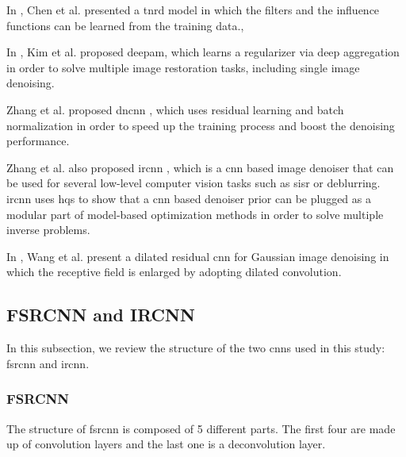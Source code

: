 In \cite{TNRD}, Chen et al. presented a  \gls{tnrd} model in which the filters and the influence functions can be learned from the training data., 

In \cite{DEEPAM}, Kim et al. proposed \gls{deepam}, which learns a regularizer via deep aggregation in order to solve multiple image restoration tasks, including single image denoising.  

Zhang et al. proposed \gls{dncnn} \cite{DNCNN}, which uses residual learning and batch normalization in order to speed up the training process and boost the denoising performance.

Zhang et al. also proposed \gls{ircnn} \cite{IRCNN}, which is a \gls{cnn} based image denoiser that can be used for several low-level computer vision tasks such as \gls{sisr} or deblurring. \gls{ircnn} uses \gls{hqs} to show that a \gls{cnn} based denoiser prior can be plugged as a modular part of model-based optimization methods in order to solve multiple inverse problems.

In \cite{DILATED}, Wang et al. present a dilated residual \gls{cnn} for Gaussian image denoising in which the receptive field is enlarged by adopting dilated convolution.

\subsection{FSRCNN and IRCNN}
In this subsection, we review the structure of the two \glspl{cnn} used in this study: \gls{fsrcnn} and \gls{ircnn}.

\subsubsection{FSRCNN} The structure of \gls{fsrcnn} is composed of 5 different parts. The first four are made up of convolution layers and the last one is a deconvolution layer.

